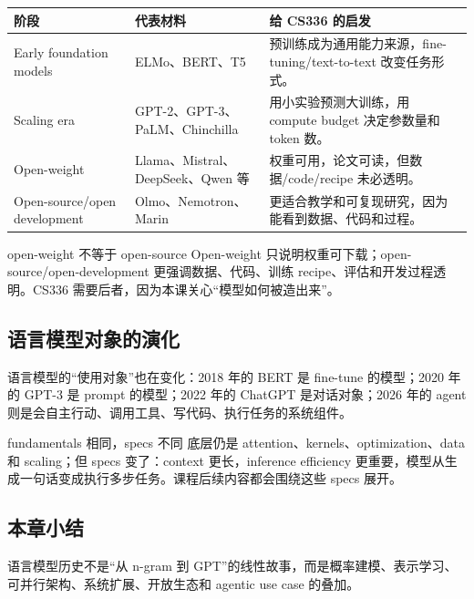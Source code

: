 \begin{longtable}{p{}p{}p{}}
\toprule
\textbf{阶段} & \textbf{代表材料} & \textbf{给 CS336 的启发} \\
\midrule
Early foundation models & ELMo、BERT、T5 & 预训练成为通用能力来源，fine-tuning/text-to-text 改变任务形式。 \\
Scaling era & GPT-2、GPT-3、PaLM、Chinchilla & 用小实验预测大训练，用 compute budget 决定参数量和 token 数。 \\
Open-weight & Llama、Mistral、DeepSeek、Qwen 等 & 权重可用，论文可读，但数据/code/recipe 未必透明。 \\
Open-source/open development & Olmo、Nemotron、Marin & 更适合教学和可复现研究，因为能看到数据、代码和过程。 \\
\bottomrule
\end{longtable}

\begin{warningbox}{open-weight 不等于 open-source}
Open-weight 只说明权重可下载；open-source/open-development 更强调数据、代码、训练 recipe、评估和开发过程透明。CS336 需要后者，因为本课关心“模型如何被造出来”。
\end{warningbox}

\subsection{语言模型对象的演化}

语言模型的“使用对象”也在变化：2018 年的 BERT 是 fine-tune 的模型；2020 年的 GPT-3 是 prompt 的模型；2022 年的 ChatGPT 是对话对象；2026 年的 agent 则是会自主行动、调用工具、写代码、执行任务的系统组件。

\begin{importantbox}{fundamentals 相同，specs 不同}
底层仍是 attention、kernels、optimization、data 和 scaling；但 specs 变了：context 更长，inference efficiency 更重要，模型从生成一句话变成执行多步任务。课程后续内容都会围绕这些 specs 展开。
\end{importantbox}

\subsection{本章小结}

语言模型历史不是“从 n-gram 到 GPT”的线性故事，而是概率建模、表示学习、可并行架构、系统扩展、开放生态和 agentic use case 的叠加。

